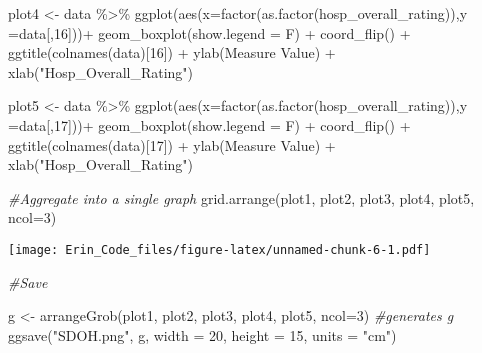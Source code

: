 \documentclass[
]{article}
\newenvironment{Shaded}{\begin{snugshade}}{\end{snugshade}}
\newcommand{\AttributeTok}[1]{\textcolor[rgb]{0.77,0.63,0.00}{#1}}
\newcommand{\CommentTok}[1]{\textcolor[rgb]{0.56,0.35,0.01}{\textit{#1}}}
\newcommand{\DecValTok}[1]{\textcolor[rgb]{0.00,0.00,0.81}{#1}}
\newcommand{\FunctionTok}[1]{\textcolor[rgb]{0.00,0.00,0.00}{#1}}
\newcommand{\NormalTok}[1]{#1}
\newcommand{\OtherTok}[1]{\textcolor[rgb]{0.56,0.35,0.01}{#1}}
\newcommand{\SpecialCharTok}[1]{\textcolor[rgb]{0.00,0.00,0.00}{#1}}
\newcommand{\StringTok}[1]{\textcolor[rgb]{0.31,0.60,0.02}{#1}}
\begin{document}
\begin{Shaded}
\begin{Highlighting}[]
\NormalTok{plot4 }\OtherTok{\textless{}{-}}\NormalTok{ data }\SpecialCharTok{\%\textgreater{}\%} \FunctionTok{ggplot}\NormalTok{(}\FunctionTok{aes}\NormalTok{(}\AttributeTok{x=}\FunctionTok{factor}\NormalTok{(}\FunctionTok{as.factor}\NormalTok{(hosp\_overall\_rating)),}\AttributeTok{y =}\NormalTok{data[,}\DecValTok{16}\NormalTok{]))}\SpecialCharTok{+}
  \FunctionTok{geom\_boxplot}\NormalTok{(}\AttributeTok{show.legend =}\NormalTok{ F) }\SpecialCharTok{+}
  \FunctionTok{coord\_flip}\NormalTok{() }\SpecialCharTok{+}
  \FunctionTok{ggtitle}\NormalTok{(}\FunctionTok{colnames}\NormalTok{(data)[}\DecValTok{16}\NormalTok{]) }\SpecialCharTok{+} 
  \FunctionTok{ylab}\NormalTok{(}\StringTok{\textquotesingle{}Measure Value\textquotesingle{}}\NormalTok{) }\SpecialCharTok{+} \FunctionTok{xlab}\NormalTok{(}\StringTok{"Hosp\_Overall\_Rating"}\NormalTok{)}

\NormalTok{plot5 }\OtherTok{\textless{}{-}}\NormalTok{ data }\SpecialCharTok{\%\textgreater{}\%} \FunctionTok{ggplot}\NormalTok{(}\FunctionTok{aes}\NormalTok{(}\AttributeTok{x=}\FunctionTok{factor}\NormalTok{(}\FunctionTok{as.factor}\NormalTok{(hosp\_overall\_rating)),}\AttributeTok{y =}\NormalTok{data[,}\DecValTok{17}\NormalTok{]))}\SpecialCharTok{+}
  \FunctionTok{geom\_boxplot}\NormalTok{(}\AttributeTok{show.legend =}\NormalTok{ F) }\SpecialCharTok{+}
  \FunctionTok{coord\_flip}\NormalTok{() }\SpecialCharTok{+}
  \FunctionTok{ggtitle}\NormalTok{(}\FunctionTok{colnames}\NormalTok{(data)[}\DecValTok{17}\NormalTok{]) }\SpecialCharTok{+} 
  \FunctionTok{ylab}\NormalTok{(}\StringTok{\textquotesingle{}Measure Value\textquotesingle{}}\NormalTok{) }\SpecialCharTok{+} \FunctionTok{xlab}\NormalTok{(}\StringTok{"Hosp\_Overall\_Rating"}\NormalTok{)}

\CommentTok{\#Aggregate into a single graph}
\FunctionTok{grid.arrange}\NormalTok{(plot1, plot2, plot3, plot4, plot5, }\AttributeTok{ncol=}\DecValTok{3}\NormalTok{)}
\end{Highlighting}
\end{Shaded}

\texttt{[image: Erin\_Code\_files/figure-latex/unnamed-chunk-6-1.pdf]}

\begin{Shaded}
\begin{Highlighting}[]
\CommentTok{\#Save}

\NormalTok{g }\OtherTok{\textless{}{-}} \FunctionTok{arrangeGrob}\NormalTok{(plot1, plot2, plot3, plot4, plot5, }\AttributeTok{ncol=}\DecValTok{3}\NormalTok{) }\CommentTok{\#generates g}
\FunctionTok{ggsave}\NormalTok{(}\StringTok{"SDOH.png"}\NormalTok{, g, }\AttributeTok{width =} \DecValTok{20}\NormalTok{, }\AttributeTok{height =} \DecValTok{15}\NormalTok{, }\AttributeTok{units =} \StringTok{"cm"}\NormalTok{)}
\end{Highlighting}
\end{Shaded}
\end{document}
